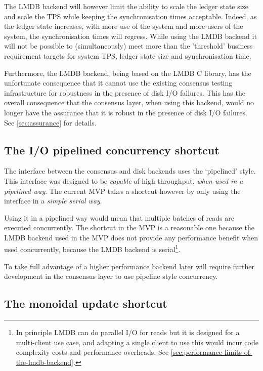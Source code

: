 \documentclass[11pt,a4paper]{article}
\begin{document}
The LMDB backend will however limit the ability to scale the ledger state size
and scale the TPS while keeping the synchronisation times acceptable. Indeed,
as the ledger state increases, with more use of the system and more users of
the system, the synchronisation times will regress. While using the LMDB
backend it will not be possible to (simultaneously) meet more than the
'threshold' business requirement targets for system TPS, ledger state size and
synchronisation time.

Furthermore, the LMDB backend, being based on the LMDB C library, has the
unfortunate consequence that it cannot use the existing consensus testing
infrastructure for robustness in the presence of disk I/O failures. This has
the overall consequence that the consensus layer, when using this backend,
would no longer have the assurance that it is robust in the presence of disk
I/O failures. See \cref{sec:assurance} for details.

\subsection{The I/O pipelined concurrency shortcut}

The interface between the consensus and disk backends uses the `pipelined'
style. This interface was designed to be \emph{capable} of high throughput,
\emph{when used in a pipelined way}. The current MVP takes a shortcut however
by only using the interface in a \emph{simple serial way}.

Using it in a pipelined way would mean that multiple batches of reads are
executed concurrently. The shortcut in the MVP is a reasonable one because the
LMDB backend used in the MVP does not provide any performance benefit when used
concurrently, because the LMDB backend is serial\footnote{In principle LMDB
can do parallel I/O for reads but it is designed for a multi-client use case,
and adapting a single client to use this would incur code complexity costs and
performance overheads. See \cref{sec:performance-limits-of-the-lmdb-backend}.}.

To take full advantage of a higher performance backend later will require
further development in the consensus layer to use pipeline style concurrency.


\subsection{The monoidal update shortcut}
\end{document}
